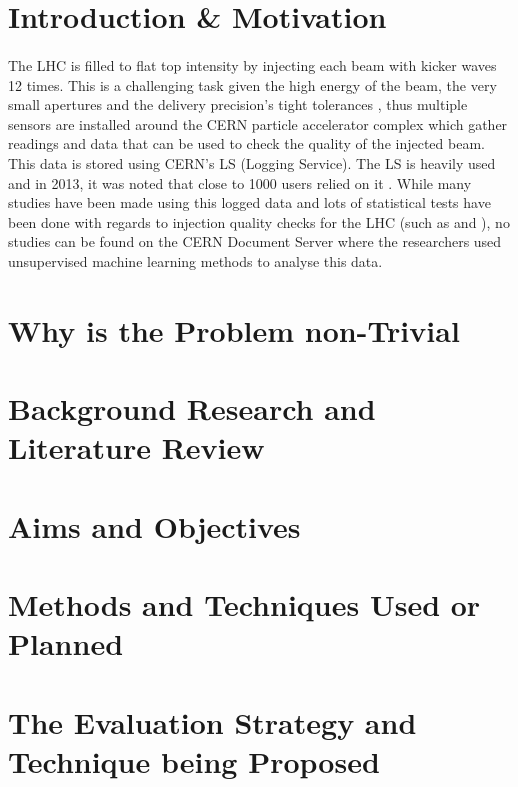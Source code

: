 \documentclass[12pt, twoside]{report}
\begin{document}
	\section{Introduction \& Motivation}	
	\paragraph{ }The LHC is filled to flat top intensity by injecting each beam with kicker waves 12 times. This is a challenging task given the high energy of the beam, the very small apertures and the delivery precision's tight tolerances \cite{r:BeamQC}, thus multiple sensors are installed around the CERN particle accelerator complex \cite{r:Diagram} which gather readings and data that can be used to check the quality of the injected beam. This data is stored using CERN's LS (Logging Service). The LS is heavily used and in 2013, it was noted that close to 1000 users relied on it \cite{r:LS}. While many studies have been made using this logged data and lots of statistical tests have been done with regards to injection quality checks for the LHC (such as \cite{r:AutomaticIQCChecks} and \cite{r:BeamQC}), no studies can be found on the CERN Document Server \cite{r:CERNDocumentServer} where the researchers used unsupervised machine learning methods to analyse this data.
	
	\section{Why is the Problem non-Trivial}
	
	\section{Background Research and Literature Review}
	
	\section{Aims and Objectives}
	
	\section{Methods and Techniques Used or Planned}
	
	\section{The Evaluation Strategy and Technique being Proposed}
	
\end{document}
